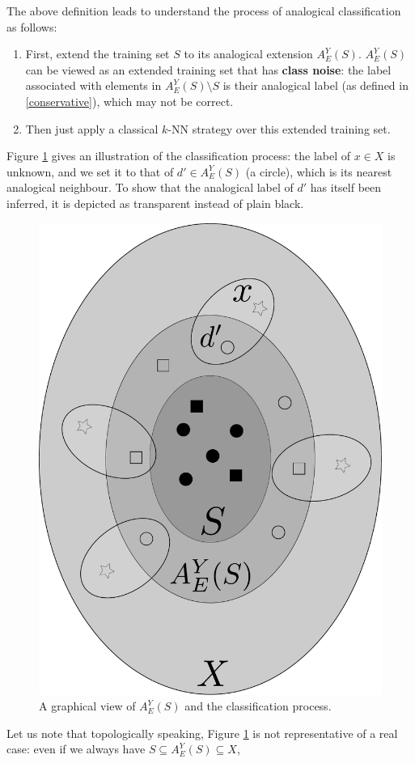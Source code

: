 The above definition leads to understand the process of analogical
classification as follows:
\begin{enumerate}
  \item First, extend the training set $S$ to its analogical extension
    $A_E^Y(S)$. $A_E^Y(S)$ can be viewed as an extended training set that has
    \textbf{class noise}: the label associated with elements in $A_E^Y(S)
    \setminus S$ is their analogical label (as defined in \ref{conservative}),
    which may not be correct.
  \item Then just apply a classical $k$-NN strategy over this extended training
    set.
\end{enumerate}

Figure \ref{extension} gives an illustration of the classification process: the
label of $x \in X$ is unknown, and we set it to that of $d' \in A_E^Y(S)$ (a
circle), which is its nearest analogical neighbour. To show that the analogical
label of $d'$ has itself been inferred, it is depicted as transparent instead of
plain black.
\begin{figure}
\caption{A graphical view of $A_E^Y(S)$ and the classification process.}
\label{extension}
\begin{center}
\includegraphics[scale=0.20]{figures/analogical_extension.pdf}
\end{center}
\end{figure}
Let us note that topologically speaking, Figure \ref{extension} is not
representative of a real case: even if we always have $S \subseteq A_E^Y(S) \subseteq X$,

